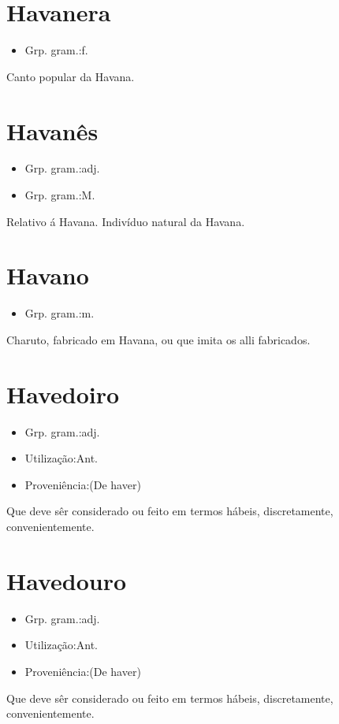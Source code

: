 \documentclass{article}
\begin{document}
\section{Havanera}
\begin{itemize}
\item {Grp. gram.:f.}
\end{itemize}
Canto popular da Havana.
\section{Havanês}
\begin{itemize}
\item {Grp. gram.:adj.}
\end{itemize}
\begin{itemize}
\item {Grp. gram.:M.}
\end{itemize}
Relativo á Havana.
Indivíduo natural da Havana.
\section{Havano}
\begin{itemize}
\item {Grp. gram.:m.}
\end{itemize}
Charuto, fabricado em Havana, ou que imita os alli fabricados.
\section{Havedoiro}
\begin{itemize}
\item {Grp. gram.:adj.}
\end{itemize}
\begin{itemize}
\item {Utilização:Ant.}
\end{itemize}
\begin{itemize}
\item {Proveniência:(De \textunderscore haver\textunderscore )}
\end{itemize}
Que deve sêr considerado ou feito em termos hábeis, discretamente, convenientemente.
\section{Havedouro}
\begin{itemize}
\item {Grp. gram.:adj.}
\end{itemize}
\begin{itemize}
\item {Utilização:Ant.}
\end{itemize}
\begin{itemize}
\item {Proveniência:(De \textunderscore haver\textunderscore )}
\end{itemize}
Que deve sêr considerado ou feito em termos hábeis, discretamente, convenientemente.
\end{document}
